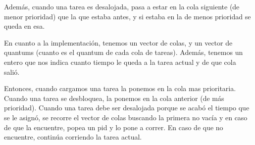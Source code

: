 Además, cuando una tarea es desalojada, pasa a estar en la cola siguiente (de menor prioridad) que la que estaba antes, y si estaba en la de menos prioridad se queda en esa.

En cuanto a la implementación, tenemos un vector de colas, y un vector de quantums (cuanto es el quantum de cada cola de tareas). Además, tenemos un entero que nos indica cuanto tiempo le queda a la tarea actual y de que cola salió.

Entonces, cuando cargamos una tarea la ponemos en la cola mas prioritaria. Cuando una tarea se desbloquea, la ponemos en la cola anterior (de más prioridad). Cuando una tarea debe ser desalojada porque se acabó el tiempo que se le asignó, se recorre el vector de colas buscando la primera no vacía y en caso de que la encuentre, popea un pid y lo pone a correr. En caso de que no encuentre, continúa corriendo la tarea actual.

